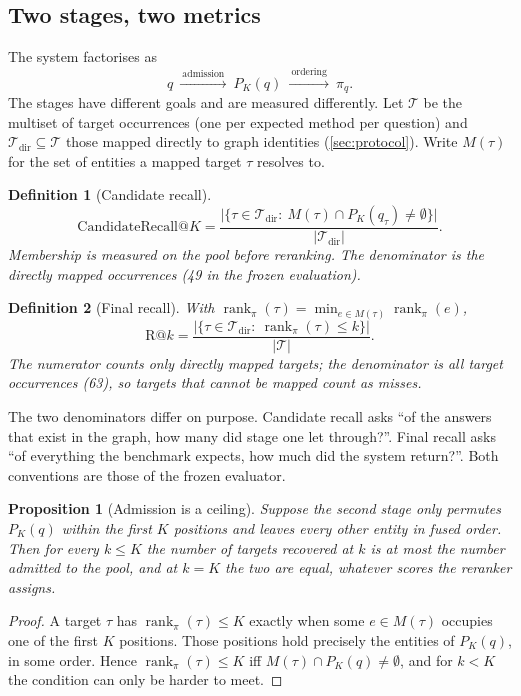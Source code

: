 \documentclass[11pt,a4paper]{article}
\newcommand{\cref}[1]{\autoref{#1}}
\newtheorem{definition}{Definition}[section]
\newtheorem{proposition}{Proposition}[section]
\theoremstyle{remark}
\DeclareMathOperator{\rank}{rank}
\begin{document}
\subsection{Two stages, two metrics}

The system factorises as
\begin{equation}
  q\ \xrightarrow{\ \text{admission}\ }\ P_K(q)\ \xrightarrow{\ \text{ordering}\ }\ \pi_q .
\end{equation}
The stages have different goals and are measured differently. Let $\mathcal T$ be the
multiset of target occurrences (one per expected method per question) and
$\mathcal T_{\mathrm{dir}}\subseteq\mathcal T$ those mapped directly to graph identities
(\cref{sec:protocol}). Write $M(\tau)$ for the set of entities a mapped target $\tau$
resolves to.

\begin{definition}[Candidate recall]
\label{def:candrecall}
\begin{equation}
 \mathrm{CandidateRecall@}K=\frac{\bigl|\{\tau\in\mathcal T_{\mathrm{dir}}:\ M(\tau)\cap P_K(q_\tau)\neq\emptyset\}\bigr|}{|\mathcal T_{\mathrm{dir}}|}.
\end{equation}
Membership is measured on the pool \emph{before} reranking. The denominator is the
directly mapped occurrences (49 in the frozen evaluation).
\end{definition}

\begin{definition}[Final recall]
\label{def:recall}
With $\rank_{\pi}(\tau)=\min_{e\in M(\tau)}\rank_\pi(e)$,
\begin{equation}
 \mathrm{R@}k=\frac{\bigl|\{\tau\in\mathcal T_{\mathrm{dir}}:\ \rank_{\pi}(\tau)\le k\}\bigr|}{|\mathcal T|}.
\end{equation}
The numerator counts only directly mapped targets; the denominator is \emph{all} target
occurrences (63), so targets that cannot be mapped count as misses.
\end{definition}

The two denominators differ on purpose. Candidate recall asks ``of the answers that exist
in the graph, how many did stage one let through?''. Final recall asks ``of everything
the benchmark expects, how much did the system return?''. Both conventions are those of
the frozen evaluator.

\begin{proposition}[Admission is a ceiling]
\label{prop:ceiling}
Suppose the second stage only permutes $P_K(q)$ within the first $K$ positions and leaves
every other entity in fused order. Then for every $k\le K$ the number of targets
recovered at $k$ is at most the number admitted to the pool, and at $k=K$ the two are
equal, whatever scores the reranker assigns.
\end{proposition}
\begin{proof}
A target $\tau$ has $\rank_\pi(\tau)\le K$ exactly when some $e\in M(\tau)$ occupies one
of the first $K$ positions. Those positions hold precisely the entities of $P_K(q)$, in
some order. Hence $\rank_\pi(\tau)\le K$ iff $M(\tau)\cap P_K(q)\neq\emptyset$, and for
$k<K$ the condition can only be harder to meet.
\end{proof}
\end{document}
